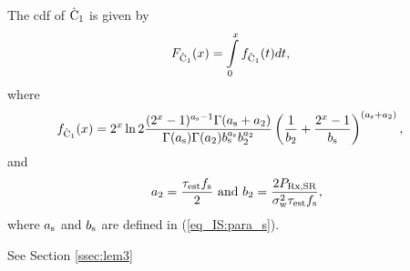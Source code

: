\begin{lemma} \label{lm_IS:lem3}
\normalfont
The cdf of $\hat{\text{C}}_{\text{1}}$ is given by  
\begin{align}
F_{\hat{\text{C}}_{\text{1}}}(x) &= \int\limits_{0}^{x} f_{\hat{\text{C}}_{\text{1}}}(t) dt, \label{eq_IS:dis_C1} 
\end{align}
where
\begin{align}
f_{\hat{\text{C}}_{\text{1}}}(x) &= 2^x \ln 2 \frac{(2^x - 1)^{a_{\text{s}} - 1} \Gamma(a_{\text{s}} + a_{\text{2}})}{\Gamma(a_{\text{s}}) \Gamma(a_{\text{2}}) b_{\text{s}}^{a_{\text{s}}} b_{\text{2}}^{a_{\text{2}}}} \left(\frac{1}{b_{\text{2}}} + \frac{2^x - 1}{b_{\text{s}}}\right)^{(a_{\text{s}} + a_{\text{2}})}, \label{eq_IS:den_C1}
\end{align}
and 
\begin{align}
\quad & a_{\text{2}} = \frac{\tau_{\text{est}} f_{\text{s}}}{2}  \text{  and  } b_{\text{2}} = \frac{2 P_{\text{Rx,SR}}}{\sigma^2_{\text{w}} \tau_{\text{est}} f_{\text{s}}}, \label{eq_IS:para_p} 
\end{align}
where $a_{\text{s}}$ and $b_{\text{s}}$ are defined in (\ref{eq_IS:para_s}). 
\end{lemma} 
\begin{IEEEproof}
See Section \ref{ssec:lem3}
\end{IEEEproof}

